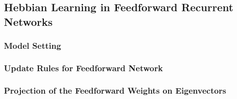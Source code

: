 \documentclass[11pt]{article}
\begin{document}
	
	\clearpage
	\subsection{Hebbian Learning in Feedforward Recurrent Networks}
	\subsubsection{Model Setting}
	\subsubsection{Update Rules for Feedforward Network}
	\subsubsection{Projection of the Feedforward Weights on Eigenvectors}
	
	
\end{document}
